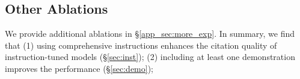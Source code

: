 \subsection{Other Ablations}
\label{sec:other_ablation}

We provide additional ablations in \S\ref{app_sec:more_exp}. 
In summary, we find that 
(1) 
using comprehensive instructions
 enhances the citation quality of instruction-tuned models (\S\ref{sec:inst});
(2) 
including at least one demonstration improves the performance %
(\S\ref{sec:demo}); 







